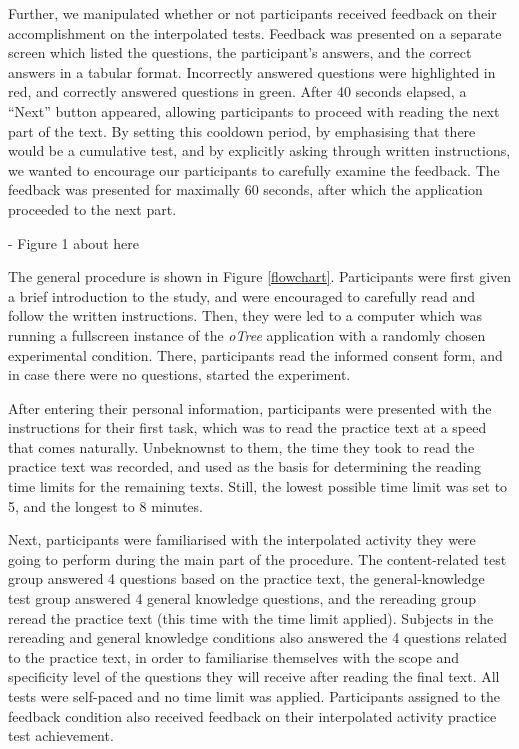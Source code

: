 Further, we manipulated whether or not participants received feedback on
their accomplishment on the interpolated tests. Feedback was presented
on a separate screen which listed the questions, the participant's
answers, and the correct answers in a tabular format. Incorrectly
answered questions were highlighted in red, and correctly answered
questions in green. After 40 seconds elapsed, a ``Next'' button
appeared, allowing participants to proceed with reading the next part of
the text. By setting this cooldown period, by emphasising that there
would be a cumulative test, and by explicitly asking through written
instructions, we wanted to encourage our participants to carefully
examine the feedback. The feedback was presented for maximally 60
seconds, after which the application proceeded to the next part.


\begin{center}
    -\-\- Figure 1 about here \-\-\-
\end{center}

The general procedure is shown in Figure \ref{flowchart}. Participants
were first given a brief introduction to the study, and were encouraged
to carefully read and follow the written instructions. Then, they were
led to a computer which was running a fullscreen instance of the
\textit{oTree} application with a randomly chosen experimental
condition. There, participants read the informed consent 
form, and in case there were no questions, started the 
experiment.

After entering their personal information, participants were presented
with the instructions for their first task, which was to read the
practice text at a speed that comes naturally. Unbeknownst to them, the time 
they took to read the practice text was recorded, and used as the basis for 
determining the reading time limits for the remaining texts. Still, the 
lowest possible time limit was set to 5, and the longest to 8 minutes.

Next, participants were familiarised with the interpolated activity they
were going to perform during the main part of the procedure. The
content-related test group answered 4 questions based on the practice
text, the general-knowledge test group answered 4 general knowledge
questions, and the rereading group reread the practice text (this time
with the time limit applied). Subjects in the rereading and general 
knowledge conditions also answered the 4 questions related to the
practice text, in order to familiarise themselves with the scope and
specificity level of the questions they will receive after reading the
final text. All tests were self-paced and no time limit was applied.
Participants assigned to the feedback condition also received feedback
on their interpolated activity practice test achievement.

